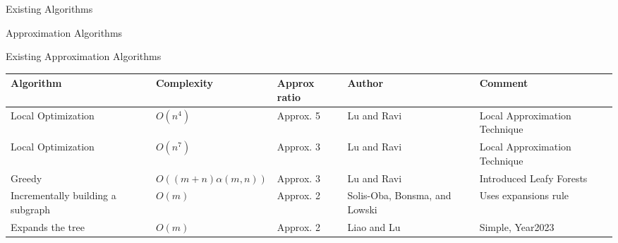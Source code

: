 \documentclass[xcolor=svgnames]{beamer}
\begin{document}
\begin{section}{Existing Algorithms}
\begin{subsection}{Approximation Algorithms}
\begin{frame}{Existing Approximation Algorithms}
\centering
\scriptsize
\begin{tabular}{m{2.5cm}m{1.5cm}m{1.25cm}m{1.75cm}m{2.3cm}}
\hline
\textbf{Algorithm}           & \textbf{Complexity}                & \textbf{Approx ratio} & \textbf{Author}                                & \textbf{Comment}                                            \\ \hline
Local Optimization\cite{lu1996power} & $O(n^4)$ &  Approx. 5 &  Lu and Ravi &  Local Approximation Technique \\ \hline
 Local Optimization \cite{lu1996power}     & $O(n^7)$           &  Approx. 3          &  Lu and Ravi                  &  Local Approximation Technique                  \\ \hline
Greedy \cite{LU1998132}   & $ O((m+n)\alpha(m,n))$        &  Approx. 3          &  Lu and Ravi                               &  Introduced Leafy Forests                  \\ \hline
 Incrementally building a subgraph \cite{solis20172}    & $O(m)$                   &  Approx. 2          & Solis-Oba, Bonsma, and Lowski                   &  Uses expansions rule                                        \\ \hline
Expands the tree       & $O(m)$                   &  Approx. 2          & Liao and Lu                                  &  Simple, Year2023        \\ \hline
                                               

\end{tabular}
\end{frame}
\end{subsection}
\end{section}
\end{document}
